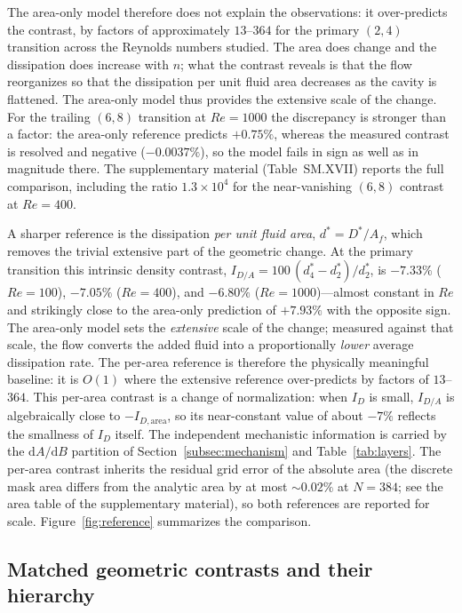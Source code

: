The area-only model therefore does not explain the observations: it over-predicts the contrast, by factors of approximately $13$--$364$ for the primary $(2,4)$ transition across the Reynolds numbers studied. The area does change and the dissipation does increase with $n$; what the contrast reveals is that the flow reorganizes so that the dissipation per unit fluid area decreases as the cavity is flattened. The area-only model thus provides the extensive scale of the change. For the trailing $(6,8)$ transition at $Re=1000$ the discrepancy is stronger than a factor: the area-only reference predicts $+0.75\%$, whereas the measured contrast is resolved and negative ($-0.0037\%$), so the model fails in sign as well as in magnitude there. The supplementary material (Table~SM.XVII) reports the full comparison, including the ratio $1.3\times10^{4}$ for the near-vanishing $(6,8)$ contrast at $Re=400$.

A sharper reference is the dissipation \emph{per unit fluid area}, $d^*=D^*/A_f$, which removes the trivial extensive part of the geometric change. At the primary transition this intrinsic density contrast, $I_{D/A}=100\,(d^*_4-d^*_2)/d^*_2$, is $-7.33\%$ ($Re=100$), $-7.05\%$ ($Re=400$), and $-6.80\%$ ($Re=1000$)---almost constant in $Re$ and strikingly close to the area-only prediction of $+7.93\%$ with the opposite sign. The area-only model sets the \emph{extensive} scale of the change; measured against that scale, the flow converts the added fluid into a proportionally \emph{lower} average dissipation rate. The per-area reference is therefore the physically meaningful baseline: it is $O(1)$ where the extensive reference over-predicts by factors of $13$--$364$. This per-area contrast is a change of normalization: when $I_D$ is small, $I_{D/A}$ is algebraically close to $-I_{D,\mathrm{area}}$, so its near-constant value of about $-7\%$ reflects the smallness of $I_D$ itself. The independent mechanistic information is carried by the $\mathrm{d}A/\mathrm{d}B$ partition of Section~\ref{subsec:mechanism} and Table~\ref{tab:layers}. The per-area contrast inherits the residual grid error of the absolute area (the discrete mask area differs from the analytic area by at most $\sim0.02\%$ at $N=384$; see the area table of the supplementary material), so both references are reported for scale. Figure~\ref{fig:reference} summarizes the comparison.

\subsection{Matched geometric contrasts and their hierarchy}
\label{subsec:contrastresult}

